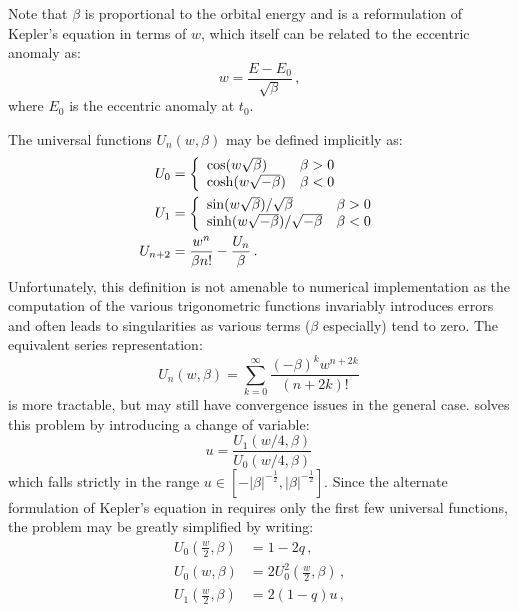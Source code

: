 Note that $\beta$ is proportional to the orbital energy and  is a reformulation of Kepler's equation in terms of $w$, which itself can be related to the eccentric anomaly as:
\begin{equation}
w = \frac{E - E_0}{\sqrt{\beta}} \,,
\end{equation}
where $E_0$ is the eccentric anomaly at $t_0$.

The universal functions $U_n(w,\beta)$ may be defined implicitly as:
\begin{align}
U_0 &= \left\{ \begin{array}{l l}
\cos(w\sqrt{\beta}) & \beta > 0\\
\cosh(w \sqrt{-\beta}) & \beta < 0 
\end{array}\right. \nonumber \\
U_1 &= \left\{ \begin{array}{l l}
\sin(w\sqrt{\beta})/\sqrt{\beta} & \beta > 0\\
\sinh(w \sqrt{-\beta})/\sqrt{-\beta} & \beta < 0 
\end{array}\right.  \\
U_{n+2} &= \frac{w^n}{\beta n!} - \frac{U_n}{\beta} \nonumber \,.
\end{align}
Unfortunately, this definition is not amenable to numerical implementation as the computation of the various trigonometric functions invariably introduces errors and often leads to singularities as various terms ($\beta$ especially) tend to zero.  The equivalent series representation:
\begin{equation}
U_n(w,\beta) = \sum_{k=0}^\infty \frac{(-\beta)^k w^{n+2k}}{(n+2k)!} \,
\end{equation}
is more tractable, but may still have convergence issues in the general case.  \citet{shepperd1985universal} solves this problem by introducing a change of variable:
\begin{equation}
u = \frac{U_1(w/4,\beta)}{U_0(w/4,\beta)} \,
\end{equation}
which falls strictly in the range $u \in [-\vert \beta \vert^{-\frac{1}{2}}, \vert \beta \vert^{-\frac{1}{2}}]$.  Since the alternate formulation of Kepler's equation in  requires only the first few universal functions, the problem may be greatly simplified by writing:
\begin{align}
U_0\left(\frac{w}{2}, \beta\right) &= 1 - 2q \,, \\
U_0(w,\beta) &= 2U_0^2\left(\frac{w}{2},\beta\right) \,,\\
U_1\left(\frac{w}{2},\beta\right) &= 2(1-q)u\,, 
\end{align}

